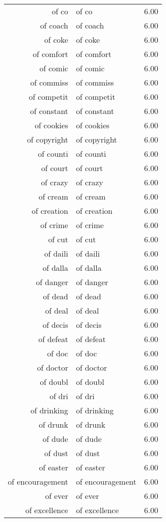 \begin{table}[ht]
\begin{tabular}{rlr}
  of co & of co & 6.00 \\ 
  of coach & of coach & 6.00 \\ 
  of coke & of coke & 6.00 \\ 
  of comfort & of comfort & 6.00 \\ 
  of comic & of comic & 6.00 \\ 
  of commiss & of commiss & 6.00 \\ 
  of competit & of competit & 6.00 \\ 
  of constant & of constant & 6.00 \\ 
  of cookies & of cookies & 6.00 \\ 
  of copyright & of copyright & 6.00 \\ 
  of counti & of counti & 6.00 \\ 
  of court & of court & 6.00 \\ 
  of crazy & of crazy & 6.00 \\ 
  of cream & of cream & 6.00 \\ 
  of creation & of creation & 6.00 \\ 
  of crime & of crime & 6.00 \\ 
  of cut & of cut & 6.00 \\ 
  of daili & of daili & 6.00 \\ 
  of dalla & of dalla & 6.00 \\ 
  of danger & of danger & 6.00 \\ 
  of dead & of dead & 6.00 \\ 
  of deal & of deal & 6.00 \\ 
  of decis & of decis & 6.00 \\ 
  of defeat & of defeat & 6.00 \\ 
  of doc & of doc & 6.00 \\ 
  of doctor & of doctor & 6.00 \\ 
  of doubl & of doubl & 6.00 \\ 
  of dri & of dri & 6.00 \\ 
  of drinking & of drinking & 6.00 \\ 
  of drunk & of drunk & 6.00 \\ 
  of dude & of dude & 6.00 \\ 
  of dust & of dust & 6.00 \\ 
  of easter & of easter & 6.00 \\ 
  of encouragement & of encouragement & 6.00 \\ 
  of ever & of ever & 6.00 \\ 
  of excellence & of excellence & 6.00 \\ 

\end{tabular}
\end{table}
